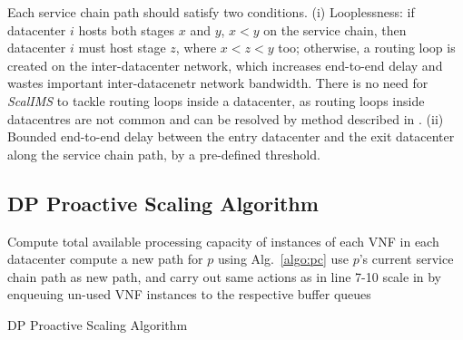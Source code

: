 Each service chain path should satisfy two conditions. (i) Looplessness: if datacenter $i$ hosts both stages $x$ and $y$, $x<y$ on the service chain, then datacenter $i$ must host stage $z$, where $x<z<y$ too; otherwise, a routing loop is created on the inter-datacenter network, which increases end-to-end delay and wastes important inter-datacenetr network bandwidth. There is no need for \textit{ScalIMS} to tackle routing loops inside a datacenter, as routing loops inside datacentres are not common and can be resolved by method described in \cite{stephens2012past}. (ii) Bounded end-to-end delay between the entry datacenter and the exit datacenter along the service chain path, by a pre-defined threshold. %

\vspace{-3mm}
\subsection{DP Proactive Scaling Algorithm}
\label{sec:dp-proactive-scaling-alg}


\begin{algorithm}[!t]
{Compute total available processing capacity of instances of each VNF in each datacenter}\;
 {%
}
 {
 	{compute a new path for $p$ using Alg.~\ref{algo:pc}}\;
}
 {
 	{use $p$'s current service chain path as new path, and carry out same actions as in line 7-10 }\;
	}
{scale in by enqueuing un-used VNF instances to the respective buffer queues}\;
\caption{DP Proactive Scaling Algorithm}
\label{algo:dpalg}
\end{algorithm}

